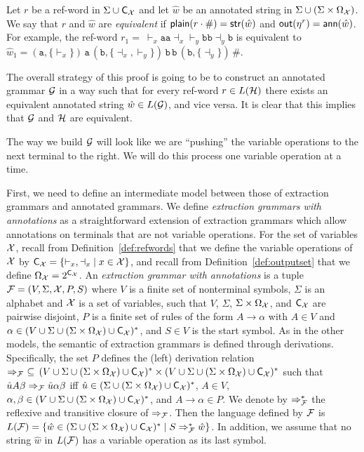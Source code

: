 %
%
%
%
%
%

Let $r$ be a ref-word in $\Sigma \cup \textsf{C}_{\mathcal{X}}$ and let $\hat{w}$ be an annotated string in $\Sigma \cup (\Sigma \times \Omega_{\mathcal{X}})$. We say that $r$ and $\hat{w}$ are \emph{equivalent} if $\textsf{plain}(r\cdot\#) = \mathsf{str}(\hat{w})$ and $\textsf{out}(\eta^{r}) = \mathsf{ann}(\hat{w})$. 
For example, the ref-word $r_1 = \ \vdash_x\!\texttt{a}\texttt{a}\!\dashv_x\vdash_y\!\texttt{b}\texttt{b}\!\dashv_y\!\texttt{b}$ is equivalent to $\hat{w}_1 = (\texttt{a},\{\vdash_x\})\,\texttt{a}\,(\texttt{b},\{\dashv_x,\vdash_y\})\,\texttt{b}\,\texttt{b}\,(\texttt{b},\{\dashv_y\})\,\#$.

The overall strategy of this proof is going to be to construct an annotated grammar $\mathcal{G}$ in a way such that for every ref-word $r\in L(\mathcal{H})$ there exists an equivalent annotated string $\hat{w}\in L(\mathcal{G})$, and vice versa. It is clear that this implies that $\mathcal{G}$ and $\mathcal{H}$ are equivalent.

The way we build $\mathcal{G}$ will look like we are ``pushing'' the variable operations to the next terminal to the right. 
We will do this process one variable operation at a time.

First, we need to define an intermediate model between those of extraction grammars and annotated grammars. 
We define \emph{extraction grammars with annotations} as a straightforward
extension of extraction grammars which allow annotations on terminals that are
not variable operations. 
For the set of variables $\mathcal{X}$, recall from Definition~\ref{def:refwords} that
we define the variable operations  of $\mathcal{X}$ by $\textsf{C}_{\mathcal{X}} = \{ {\vdash_x},
{\dashv_x} \mid x\in \mathcal{X}\}$,
and recall from Definition~\ref{def:outputset} that we define $\Omega_{\mathcal{X}} = 2^{\textsf{C}_{\mathcal{X}}}$. An \emph{extraction grammar with annotations} is a tuple
$\mathcal{F} = (V, \Sigma, \mathcal{X}, P, S)$ where 
$V$ is a finite set of nonterminal symbols, $\Sigma$ is an alphabet and $\mathcal{X}$ is a set of variables, such that $V$, $\Sigma$, $\Sigma\times\Omega_{\mathcal{X}}$, and $\textsf{C}_{\mathcal{X}}$ are pairwise disjoint, 
$P$ is a finite set of rules of the form $A \to \alpha$ with $A \in
V$ and $\alpha \in (V \cup \Sigma \cup (\Sigma\times\Omega_{\mathcal{X}}) \cup \textsf{C}_{\mathcal{X}})^*$, and $S \in V$ is the
start symbol. As in the other models, the semantic of extraction grammars is defined through derivations. Specifically,  the set $P$ defines the (left) derivation relation $\Rightarrow_{\mathcal{F}} \ \subseteq \, (V \cup \Sigma  \cup (\Sigma\times\Omega_{\mathcal{X}}) \cup \textsf{C}_{\mathcal{X}})^* \times (V \cup \Sigma  \cup (\Sigma\times\Omega_{\mathcal{X}}) \cup  \textsf{C}_{\mathcal{X}})^*$ such that $\hat{u} A \beta \Rightarrow_{\mathcal{F}} \hat{u} \alpha \beta$ iff $\hat{u} \in (\Sigma  \cup (\Sigma\times\Omega_{\mathcal{X}}) \cup \textsf{C}_{\mathcal{X}})^*$, $A \in V$, $\alpha, \beta \in (V \cup \Sigma \cup (\Sigma\times\Omega_{\mathcal{X}}) \cup \textsf{C}_{\mathcal{X}})^*$, and $A \rightarrow \alpha \in P$. We denote by $\Rightarrow_{\mathcal{F}}^*$ the reflexive and transitive closure of $\Rightarrow_{\mathcal{F}}$. Then the language defined by $\mathcal{F}$ is $L(\mathcal{F}) = \{\hat{w} \in (\Sigma \cup (\Sigma\times\Omega_{\mathcal{X}}) \cup \textsf{C}_{\mathcal{X}})^* \mid S \Rightarrow_{\mathcal{F}}^* \hat{w}\}$. In addition, we assume that no string $\hat{w}$ in $L(\mathcal{F})$ has a variable operation as its last symbol.

